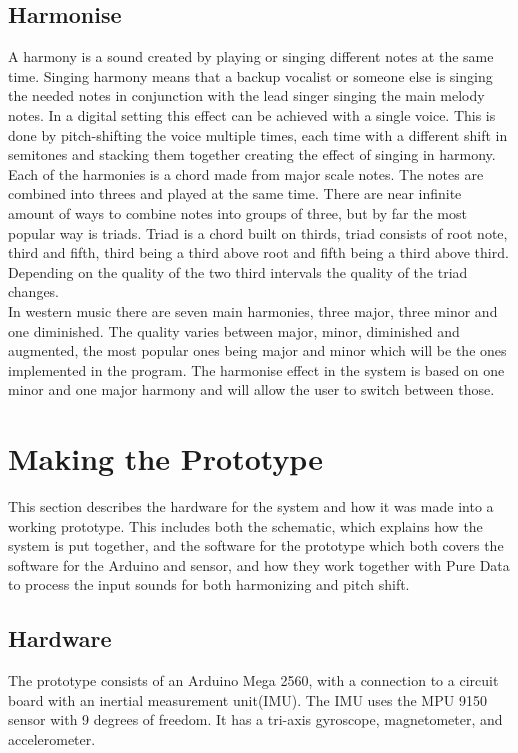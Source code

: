 \subsection{Harmonise}

A harmony is a sound created by playing or singing different notes at the same time\citep{Harmonise02}.
Singing harmony means that a backup vocalist or someone else is singing the needed notes in conjunction with the lead singer singing the main melody notes. In a digital setting this effect can be achieved with a single voice. This is done by pitch-shifting the voice multiple times, each time with a different shift in semitones and stacking them together creating the effect of singing in harmony. Each of the harmonies is a chord made from major scale notes.
The notes are combined into threes and played at the same time. There are near infinite amount of ways to combine notes into groups of three, but by far the most popular way is triads\citep{Harmonise01}. Triad is a chord built on thirds, triad consists of root note, third and fifth, third being a third above root and fifth being a third above third. Depending on the quality of the two third intervals the quality of the triad changes. \\
In western music there are seven main harmonies, three major, three minor and one diminished. The quality varies between major, minor, diminished and augmented, the most popular ones being major and minor which will be the ones implemented in the program. The harmonise effect in the system is based on one minor and one major harmony and will allow the user to switch between those.

\section{Making the Prototype}

This section describes the hardware for the system and how it was made into a working prototype. This includes both the schematic, which explains how the system is put together, and the software for the prototype which both covers the software for the Arduino and sensor, and how they work together with Pure Data to process the input sounds for both harmonizing and pitch shift.

\subsection{Hardware}

The prototype consists of an Arduino Mega 2560\citep{Arduino}, with a connection to a circuit board with an inertial measurement unit(IMU). 
The IMU uses the MPU 9150 sensor with 9 degrees of freedom\citep{MPU}. It has a tri-axis gyroscope, magnetometer, and accelerometer.
